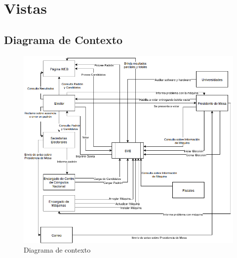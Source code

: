 \documentclass[spanish, 10pt,a4paper]{article}
\numberwithin{equation}{section} %
\begin{document}
\newpage
\section{Vistas}
\subsection{Diagrama de Contexto}

\begin{figure}[H]
  \centering
  \includegraphics[scale=0.50]{pdf/DiagramaDeContexto}
  \caption{Diagrama de contexto}
  \label{fig:DiagramaDeContexto}
\end{figure}
\end{document}
